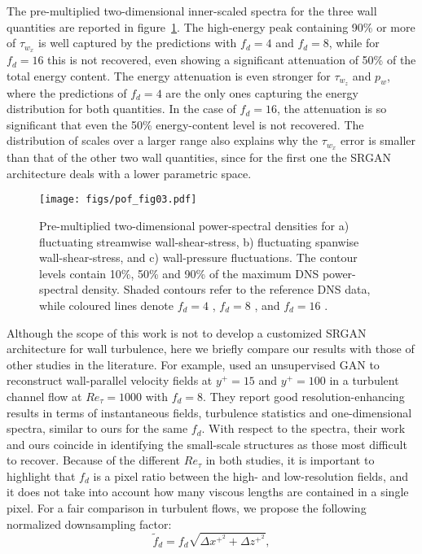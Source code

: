 The pre-multiplied two-dimensional inner-scaled spectra for the three wall quantities are reported in figure~\ref{fig:03}.
The high-energy peak containing 90\% or more of $\tau_{w_x}$ is well captured by the predictions with $f_d=4$ and $f_d=8$, while for $f_d=16$ this is not recovered, even showing a significant attenuation of 50\% of the total energy content.
The energy attenuation is even stronger for  $\tau_{w_z}$ and $p_w$, where the predictions of $f_d=4$ are the only ones capturing the energy distribution for both quantities.
In the case of $f_d=16$, the attenuation is so significant that even the 50\% energy-content level is not recovered.
The distribution of scales over a larger range also explains why the $\tau_{w_x}$ error is smaller than that of the other two wall quantities, since for the first one the SRGAN architecture deals with a lower parametric space.

\begin{figure}
  \centerline{\texttt{[image: figs/pof\_fig03.pdf]}}
  \caption{Pre-multiplied two-dimensional power-spectral densities for a) fluctuating streamwise wall-shear-stress, b) fluctuating spanwise wall-shear-stress, and c) wall-pressure fluctuations. The contour levels contain 10\%, 50\% and 90\% of the maximum DNS power-spectral density. Shaded contours refer to the reference DNS data, while coloured lines denote $f_d=4$ , $f_d=8$ , and $f_d=16$ .}
\label{fig:03}
\end{figure}

Although the scope of this work is not to develop a customized SRGAN architecture for wall turbulence, here we briefly compare our results with those of other studies in the literature.
For example, \citet{kim2021unsupervised} used an unsupervised GAN to reconstruct wall-parallel velocity fields at $y^+=15$ and $y^+=100$ in a turbulent channel flow at $Re_{\tau}=1000$ with $f_d=8$.
They report good resolution-enhancing results in terms of instantaneous fields, turbulence statistics and one-dimensional spectra, similar to ours for the same $f_d$.
With respect to the spectra, their work and ours coincide in identifying the small-scale structures as those most difficult to recover.
Because of the different $Re_{\tau}$ in both studies, it is important to highlight that $f_d$ is a pixel ratio between the high- and low-resolution fields, and it does not take into account how many viscous lengths are contained in a single pixel.
For a fair comparison in turbulent flows, we propose the following normalized downsampling factor:
\begin{equation}
    \tilde{f}_{d}=f_d\sqrt{\Delta x^{{+}^2} + \Delta z^{{+}^2}},
    \label{eq:03}
\end{equation}

